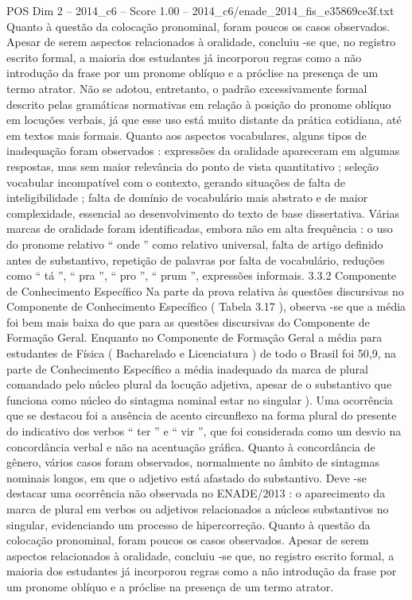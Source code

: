 \begin{textsample}{POS Dim 2 – 2014\_c6 – Score 1.00 – 2014\_c6/enade\_2014\_fis\_e35869ce3f.txt}
Quanto à questão da colocação pronominal, foram poucos os casos observados.
Apesar de serem aspectos relacionados à oralidade, concluiu -se que, no registro escrito formal, a maioria dos estudantes já incorporou regras como a não introdução da frase por um pronome oblíquo e a próclise na presença de um termo atrator.
Não se adotou, entretanto, o padrão excessivamente formal descrito pelas gramáticas normativas em relação à posição do pronome oblíquo em locuções verbais, já que esse uso está muito distante da prática cotidiana, até em textos mais formais.
Quanto aos aspectos vocabulares, alguns tipos de inadequação foram observados : expressões da oralidade apareceram em algumas respostas, mas sem maior relevância do ponto de vista quantitativo ; seleção vocabular incompatível com o contexto, gerando situações de falta de inteligibilidade ; falta de domínio de vocabulário mais abstrato e de maior complexidade, essencial ao desenvolvimento do texto de base dissertativa.
Várias marcas de oralidade foram identificadas, embora não em alta frequência : o uso do pronome relativo “ onde ” como relativo universal, falta de artigo definido antes de substantivo, repetição de palavras por falta de vocabulário, reduções como “ tá ”, “ pra ”, “ pro ”, “ prum ”, expressões informais. 3.3.2 Componente de Conhecimento Específico Na parte da prova relativa às questões discursivas no Componente de Conhecimento Específico ( Tabela 3.17 ), observa -se que a média foi bem mais baixa do que para as questões discursivas do Componente de Formação Geral.
Enquanto no Componente de Formação Geral a média para estudantes de Física ( Bacharelado e Licenciatura ) de todo o Brasil foi 50,9, na parte de Conhecimento Específico a média inadequado da marca de plural comandado pelo núcleo plural da locução adjetiva, apesar de o substantivo que funciona como núcleo do sintagma nominal estar no singular ).
Uma ocorrência que se destacou foi a ausência de acento circunflexo na forma plural do presente do indicativo dos verbos “ ter ” e “ vir ”, que foi considerada como um desvio na concordância verbal e não na acentuação gráfica.
Quanto à concordância de gênero, vários casos foram observados, normalmente no âmbito de sintagmas nominais longos, em que o adjetivo está afastado do substantivo.
Deve -se destacar uma ocorrência não observada no ENADE/2013 : o aparecimento da marca de plural em verbos ou adjetivos relacionados a núcleos substantivos no singular, evidenciando um processo de hipercorreção.
Quanto à questão da colocação pronominal, foram poucos os casos observados.
Apesar de serem aspectos relacionados à oralidade, concluiu -se que, no registro escrito formal, a maioria dos estudantes já incorporou regras como a não introdução da frase por um pronome oblíquo e a próclise na presença de um termo atrator.

\end{textsample}
